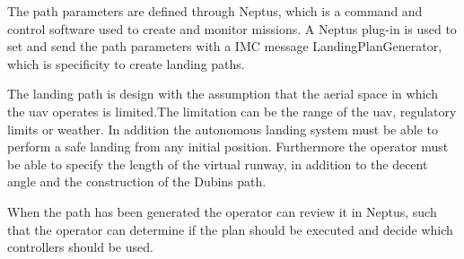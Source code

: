 The path parameters are defined through Neptus, which is a command and control software used to create and monitor missions. A Neptus plug-in is used to set and send the path parameters with a IMC message LandingPlanGenerator, which is specificity to create landing paths.

The landing path is design with the assumption that the aerial space in which the \gls{uav} operates is limited.The limitation can be the range of the uav, regulatory limits or weather. In addition the autonomous landing system must be able to perform a safe landing from any initial position. Furthermore the operator must be able to specify the length of the virtual runway, in addition to the decent angle and the construction of the Dubins path.

When the path has been generated the operator can review it in Neptus, such that the operator can determine if the plan should be executed and decide which controllers should be used.  
